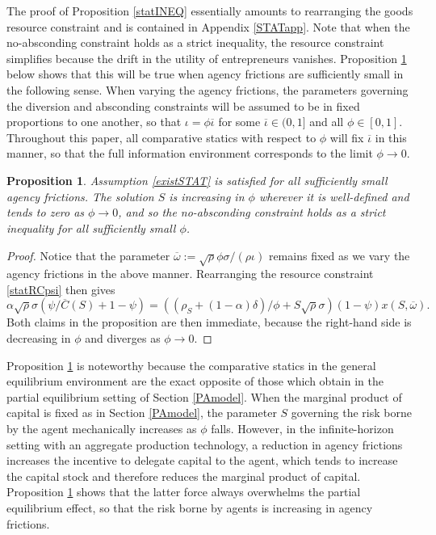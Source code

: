 \documentclass[11pt]{article}
\theoremstyle{plain}
\newtheorem{prop}[thm]{Proposition}
\theoremstyle{definition} %
\begin{document}
The proof of Proposition \ref{statINEQ} essentially amounts to rearranging the goods resource constraint and is contained in Appendix \ref{STATapp}. Note that when the no-absconding constraint holds as a strict inequality, the resource constraint simplifies because the drift in the utility of entrepreneurs vanishes. Proposition \ref{suffPROP} below shows that this will be true when agency frictions are sufficiently small in the following sense. When varying the agency frictions, the parameters governing the diversion and absconding constraints will be assumed to be in fixed proportions to one another, so that $\iota = \phi \overline{\iota}$ for some $\overline{\iota} \in (0, 1]$ and all $\phi \in [0,1]$. Throughout this paper, all comparative statics with respect to $\phi$ will fix $\overline{\iota}$ in this manner, so that the full information environment corresponds to the limit $\phi \rightarrow 0$. 

\begin{prop} \label{suffPROP}
Assumption \ref{existSTAT} is satisfied for all sufficiently small agency frictions. The solution $\hat{S}$ is increasing in $\phi$ wherever it is well-defined and tends to zero as $\phi \rightarrow 0$, and so the no-absconding constraint holds as a strict inequality for all sufficiently small $\phi$.  
\end{prop}

\begin{proof}
Notice that the parameter $\overline{\omega} := \sqrt{\rho}\phi \sigma/(\rho \iota)$ remains fixed as we vary the agency frictions in the above manner. Rearranging the resource constraint \eqref{statRCpsi} then gives
$$
\alpha\sqrt{\rho}\sigma (\psi/\overline{C}(S) + 1 - \psi) = {\left((\rho_S + (1-\alpha)\delta)/\phi + S\sqrt{\rho}\sigma\right)}(1-\psi)x(S, \overline{\omega}).
$$
Both claims in the proposition are then immediate, because the right-hand side is decreasing in $\phi$ and diverges as $\phi \rightarrow 0$. 
\end{proof}

Proposition \ref{suffPROP} is noteworthy because the comparative statics in the general equilibrium environment are the exact opposite of those which obtain in the partial equilibrium setting of Section \ref{PAmodel}. When the marginal product of capital is fixed as in Section \ref{PAmodel}, the parameter $S$ governing the risk borne by the agent mechanically increases as $\phi$ falls. However, in the infinite-horizon setting with an aggregate production technology, a reduction in agency frictions increases the incentive to delegate capital to the agent, which tends to increase the capital stock and therefore reduces the marginal product of capital. Proposition \ref{suffPROP} shows that the latter force always overwhelms the partial equilibrium effect, so that the risk borne by agents is increasing in agency frictions. 
\end{document}

